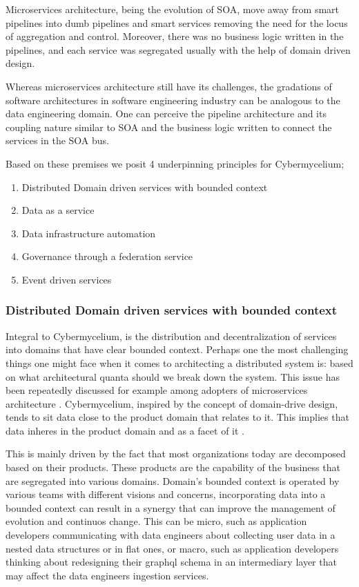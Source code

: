 \documentclass[review]{elsarticle}
\begin{document}
Microservices architecture, being the evolution of SOA, move away from smart pipelines into dumb pipelines and smart services removing the need for the locus of aggregation and control. Moreover, there was no business logic written in the pipelines, and each service was segregated usually with the help of domain driven design.

Whereas microservices architecture still have its challenges, the gradations of software architectures in software engineering industry can be analogous to the data engineering domain. One can perceive the pipeline architecture and its coupling nature similar to SOA and the business logic written to connect the services in the SOA bus.

Based on these premises we posit 4 underpinning principles for Cybermycelium;

\begin{enumerate}
    \item Distributed Domain driven services with bounded context
    \item Data as a service
    \item Data infrastructure automation
    \item Governance through a federation service
    \item Event driven services

\end{enumerate}

\subsubsection{Distributed Domain driven services with bounded context}

Integral to Cybermycelium, is the distribution and decentralization of services into domains that have clear bounded context. Perhaps one the most challenging things one might face when it comes to architecting a distributed system is: based on what architectural quanta should we break down the system. This issue has been repeatedly discussed for example among adopters of microservices architecture . Cybermycelium, inspired by the concept of domain-drive design, tends to sit data close to the product domain that relates to it. This implies that data inheres in the product domain and as a facet of it \cite{laigner2021data}.

This is mainly driven by the fact that most organizations today are decomposed based on their products. These products are the capability of the business that are segregated into various domains. Domain's bounded context is operated by various teams with different visions and concerns, incorporating data into a bounded context can result in a synergy that can improve the management of evolution and continuos change. This can be micro, such as application developers communicating with data engineers about collecting user data in a nested data structures or in flat ones, or macro, such as application developers thinking about redesigning their graphql schema in an intermediary layer that may affect the data engineers ingestion services.
\end{document}
